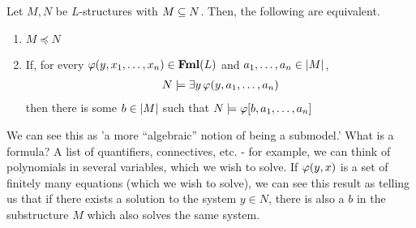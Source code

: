 \begin{boxtheorem}\label{Ch1:Thm:Tarski-Vaught}
    Let $M, N$ be $L$-structures with $M \subseteq N$. Then, the following are equivalent.
    \begin{enumerate}
        \item $M \preceq N$
        \item If, for every $\varphi\!\left( y, x_1, \ldots, x_n \right) \in \mathbf{Fml}(L)$ and $a_1, \ldots, a_n \in \left\lvert M \right\rvert$,
        \begin{align*}
            N \models \exists y \, \varphi\!\left( y ,a_1, \ldots, a_n \right)
        \end{align*}
        then there is some $b \in \left\lvert M \right\rvert$ such that $N \models \varphi\!\left[ b, a_1, \ldots, a_n \right]$
    \end{enumerate}
\end{boxtheorem}
\begin{remark}
    We can see this as 'a more ``algebraic'' notion of being a submodel.' What is a formula? A list of quantifiers, connectives, etc. - for example, we can think of polynomials in several variables, which we wish to solve. If $\varphi(y,x)$ is a set of finitely many equations (which we wish to solve), we can see this result as telling us that if there exists a solution to the system $y\in N$, there is also a $b$ in the substructure $M$ which also solves the same system. 
\end{remark}
